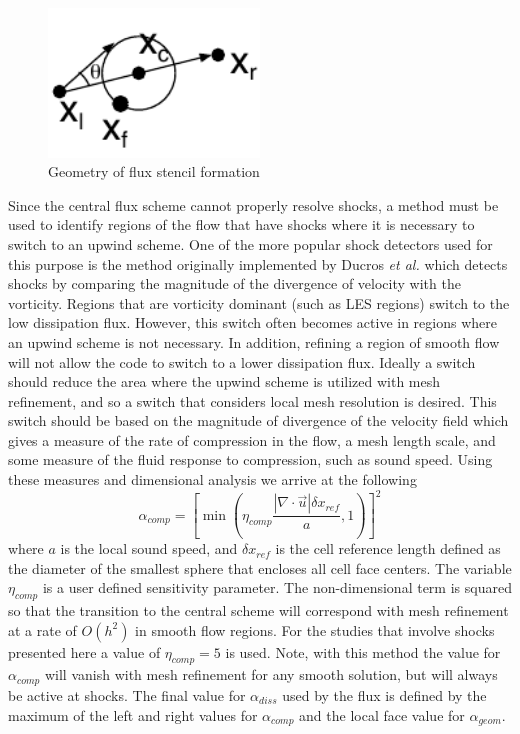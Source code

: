 \begin{figure}[h]
\begin{center}
\includegraphics[width=0.5\textwidth]{geom_test}
\caption{Geometry of flux stencil formation}
\label{fig:stencilangle}
\end{center}
\end{figure}

Since the central flux scheme cannot properly resolve shocks, a method
must be used to identify regions of the flow that have shocks where it
is necessary to switch to an upwind scheme.  One of the more popular
shock detectors used for this purpose is the method originally
implemented by Ducros {\it et al.}\cite{Ducros.2000} which detects
shocks by comparing the magnitude of the divergence of velocity with
the vorticity.  Regions that are vorticity dominant (such as LES
regions) switch to the low dissipation flux.  However, this switch
often becomes active in regions where an upwind scheme is not
necessary.  In addition, refining a region of smooth flow will not
allow the code to switch to a lower dissipation flux.  Ideally a
switch should reduce the area where the upwind scheme is utilized with
mesh refinement, and so a switch that considers local mesh resolution
is desired.  This switch should be based on the magnitude of
divergence of the velocity field which gives a measure of the
rate of compression in the flow, a mesh length scale, and some measure of
the fluid response to compression, such as sound speed.  Using these
measures and dimensional analysis we arrive at the following
\begin{equation}
\alpha_{comp} = \left[\min\left(\eta_{comp}\frac{\left| \nabla \cdot
        \vec{u} \right| \delta x_{ref}}{a },1\right)\right]^2
\label{eq:alphacomp}
\end{equation}
where $a$ is the local sound speed, and $\delta x_{ref}$ is the cell
reference length defined as the diameter of the smallest sphere that
encloses all cell face centers.  The variable $\eta_{comp}$ is a user
defined sensitivity parameter.  The non-dimensional term is squared so
that the transition to the central scheme will correspond with mesh
refinement at a rate of $O(h^2)$ in smooth flow regions.  For the
studies that involve shocks presented here a value of $\eta_{comp} =
5$ is used.  Note, with this method the value for $\alpha_{comp}$ will
vanish with mesh refinement for any smooth solution, but will always
be active at shocks.  The final value for $\alpha_{diss}$ used by the
flux is defined by the maximum of the left and right values for
$\alpha_{comp}$ and the local face value for $\alpha_{geom}$.
